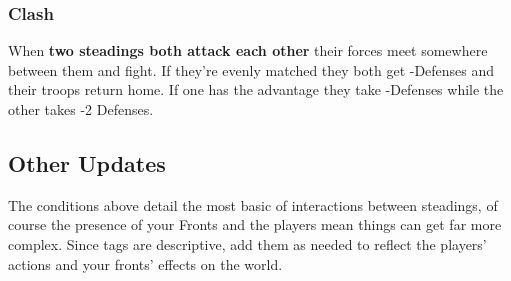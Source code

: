        
\subsubsection{Clash}   
       

When {\bf two steadings both attack each other}  their forces meet somewhere between them and fight. If they're evenly matched they both get -Defenses and their troops return home. If one has the advantage they take -Defenses while the other takes -2 Defenses.

       
\subsection{Other Updates}   
       

The conditions above detail the most basic of interactions between steadings, of course the presence of your Fronts and the players mean things can get far more complex. Since tags are descriptive, add them as needed to reflect the players' actions and your fronts' effects on the world.

       
